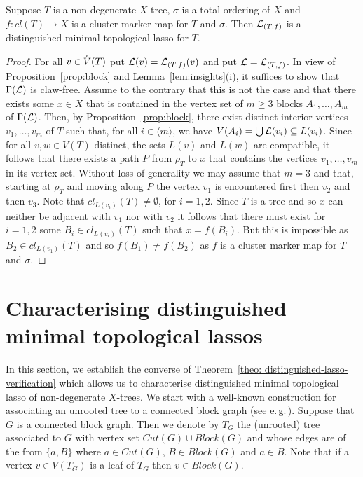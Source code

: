 \begin{thm}
  \label{theo: distinguished-lasso-verification}
  Suppose $T$ is a non-degenerate $X$-tree, $\sigma$ is a total ordering of
  $X$ and $f:cl(T)\to X$ is a cluster marker map for $T$ and $\sigma$. Then
  ${\mathcal L}_{(T,f)}$ is a distinguished minimal topological lasso for $T$.
\end{thm}
\begin{proof}
  For all $v\in \mathring{V}(T)$ put ${\mathcal L}(v) = {\mathcal L}_{(T,f)}(v)$ and put
  ${\mathcal L}={\mathcal L}_{(T,f)}$.  In view of Proposition~\ref{prop:block} and
  Lemma~\ref{lem:insights}(i), it suffices to show that $\Gamma({\mathcal L})$ is
  claw-free.  Assume to the contrary that this is not the case and that there
  exists some $x\in X$ that is contained in the vertex set of $m\geq 3$ blocks
  $A_1,\ldots,A_m$ of $\Gamma({\mathcal L})$. Then, by Proposition~\ref{prop:block},
  there exist distinct interior vertices $v_1, \ldots, v_m$ of $T$ such that,
  for all $i\in\langle m\rangle$, we have $V(A_i)=\bigcup{\mathcal L}(v_i)\subseteq
  L(v_i)$.  Since for all $v,w\in V(T)$ distinct, the sets $L(v)$ and $L(w)$
  are compatible, it follows that there exists a path $P$ from $\rho_T$ to $x$
  that contains the vertices $v_1,\ldots, v_m$ in its vertex set. Without loss
  of generality we may assume that $m=3$ and that, starting at $\rho_T$ and
  moving along $P$ the vertex $v_1$ is encountered first then $v_2$ and then
  $v_3$. Note that $cl_{L(v_i)}(T)\not=\emptyset$, for $i=1,2$.  Since $T$ is
  a tree and so $x$ can neither be adjacent with $v_1$ nor with $v_2$ it
  follows that there must exist for $i=1,2$ some $B_i\in cl_{L(v_i)}(T)$ such
  that $x=f(B_i)$. But this is impossible as $B_2\in cl_{L(v_1)}(T)$ and so
  $f(B_1)\not=f(B_2)$ as $f$ is a cluster marker map for $T$ and $\sigma$.
\end{proof}
 

\section{Characterising distinguished minimal topological lassos}
\label{sec:characterization-distinguished}

In this section, we establish the converse of Theorem~\ref{theo:
  distinguished-lasso-verification} which allows us to characterise
distinguished minimal topological lasso of non-degenerate $X$-trees.  We start
with a well-known construction for associating an unrooted tree to a connected
block graph (see e.\,g.\,\cite{diestel}).  Suppose that $G$ is a connected
block graph. Then we denote by $T_G$ the (unrooted) tree associated to $G$
with vertex set $Cut(G)\cup Block(G)$ and whose edges are of the from
$\{a,B\}$ where $a\in Cut(G)$, $B\in Block(G)$ and $a\in B$. Note that if a
vertex $v\in V(T_G)$ is a leaf of $T_G$ then $v\in Block(G)$.

